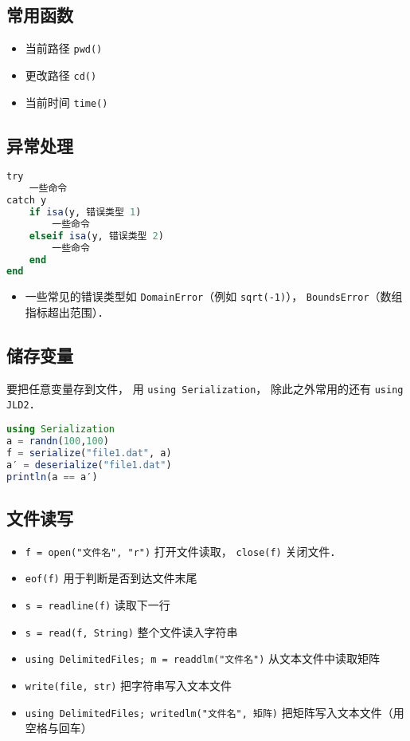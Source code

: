 \subsection{常用函数}
\begin{itemize}
\item 当前路径 \verb|pwd()|
\item 更改路径 \verb|cd()|
\item 当前时间 \verb|time()|
\end{itemize}

\subsection{异常处理}
\begin{lstlisting}[language=julia]
try
    一些命令
catch y
    if isa(y, 错误类型 1)
        一些命令
    elseif isa(y, 错误类型 2)
        一些命令
    end
end
\end{lstlisting}
\begin{itemize}
\item 一些常见的错误类型如 \verb|DomainError|（例如 \verb|sqrt(-1)|）， \verb|BoundsError|（数组指标超出范围）．
\end{itemize}


\subsection{储存变量}
要把任意变量存到文件， 用 \verb|using Serialization|， 除此之外常用的还有 \verb|using JLD2|．
\begin{lstlisting}[language=julia]
using Serialization
a = randn(100,100)
f = serialize("file1.dat", a)
a′ = deserialize("file1.dat")
println(a == a′)
\end{lstlisting}

\subsection{文件读写}
\begin{itemize}
\item \verb|f = open("文件名", "r")| 打开文件读取， \verb|close(f)| 关闭文件．
\item \verb|eof(f)| 用于判断是否到达文件末尾
\item \verb|s = readline(f)| 读取下一行
\item \verb|s = read(f, String)| 整个文件读入字符串
\item \verb|using DelimitedFiles; m = readdlm("文件名")| 从文本文件中读取矩阵
\item \verb|write(file, str)| 把字符串写入文本文件
\item \verb|using DelimitedFiles; writedlm("文件名", 矩阵)| 把矩阵写入文本文件（用空格与回车）
\end{itemize}

